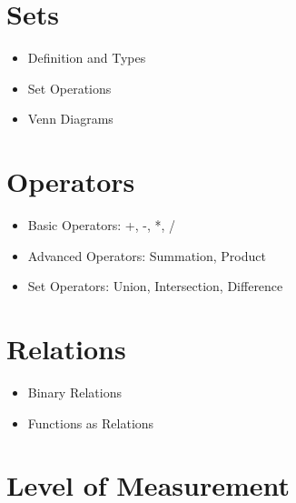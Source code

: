 \documentclass[
  11pt,
  letterpaper,
  DIV=11,
  numbers=noendperiod]{scrartcl}
\providecommand{\tightlist}{%
  \setlength{\itemsep}{0pt}\setlength{\parskip}{0pt}}\usepackage{longtable,booktabs,array}
\begin{document}
\section{Sets}\label{sets}

\begin{itemize}
\tightlist
\item
  Definition and Types
\end{itemize}

\begin{itemize}
\tightlist
\item
  Set Operations
\end{itemize}

\begin{itemize}
\tightlist
\item
  Venn Diagrams
\end{itemize}

\section{Operators}\label{operators}

\begin{itemize}
\tightlist
\item
  Basic Operators: +, -, *, /
\end{itemize}

\begin{itemize}
\tightlist
\item
  Advanced Operators: Summation, Product
\end{itemize}

\begin{itemize}
\tightlist
\item
  Set Operators: Union, Intersection, Difference
\end{itemize}

\section{Relations}\label{relations}

\begin{itemize}
\tightlist
\item
  Binary Relations
\end{itemize}

\begin{itemize}
\tightlist
\item
  Functions as Relations
\end{itemize}

\section{Level of Measurement}\label{level-of-measurement}
\end{document}

